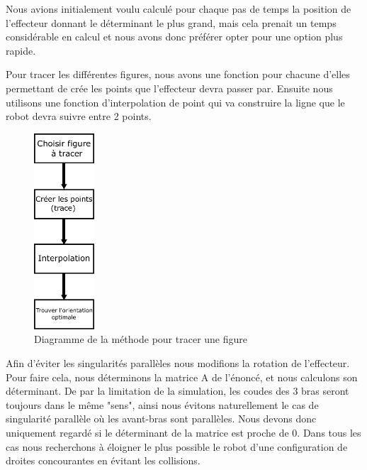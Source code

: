 \documentclass[a4paper, 11pt]{report}
\begin{document}
Nous avions initialement voulu calculé pour chaque pas de temps la position de l'effecteur donnant le déterminant le plus grand, mais cela prenait un temps considérable en calcul et nous avons donc préférer opter pour une option plus rapide.


Pour tracer les différentes figures, nous avons une fonction pour chacune d'elles permettant de crée les points que l'effecteur devra passer par. Ensuite nous utilisons une fonction d'interpolation de point qui va construire la ligne que le robot devra suivre entre 2 points.
\begin{figure}[!htb]
    \centering
    \includegraphics[width=0.2\textwidth]{Figures/diag_trace_method.pdf}
    \caption{Diagramme de la méthode pour tracer une figure}
    \label{fig:diag_tracemethode}
\end{figure}


Afin d'éviter les singularités parallèles nous modifions la rotation de l'effecteur. Pour faire cela, nous déterminons la matrice A de l'énoncé, et nous calculons son déterminant. De par la limitation de la simulation, les coudes des 3 bras seront toujours dans le même "sens", ainsi nous évitons naturellement le cas de singularité parallèle où les avant-bras sont parallèles. Nous devons donc uniquement regardé si le déterminant de la matrice est proche de 0. Dans tous les cas nous recherchons à éloigner le plus possible le robot d'une configuration de droites concourantes en évitant les collisions.
\end{document}
